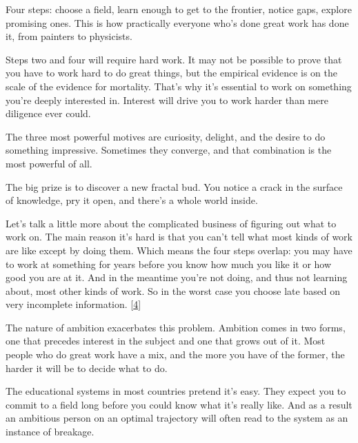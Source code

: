 Four steps: choose a field, learn enough to get
                  to the frontier, notice gaps, explore promising ones. This is
                  how practically everyone who's done great work has done it,
                  from painters to physicists.

Steps two and four
                  will require hard work. It may not be possible to prove that
                  you have to work hard to do great things, but the empirical
                  evidence is on the scale of the evidence for mortality. That's
                  why it's essential to work on something you're deeply
                  interested in. Interest will drive you to work harder than
                  mere diligence ever could.

The three most powerful
                  motives are curiosity, delight, and the desire to do something
                  impressive. Sometimes they converge, and that combination is
                  the most powerful of all.

The big prize is to
                  discover a new fractal bud. You notice a crack in the surface
                  of knowledge, pry it open, and there's a whole world
                  inside.





Let's talk a little
                  more about the complicated business of figuring out what to
                  work on. The main reason it's hard is that you can't tell what
                  most kinds of work are like except by doing them. Which means
                  the four steps overlap: you may have to work at something for
                  years before you know how much you like it or how good you are
                  at it. And in the meantime you're not doing, and thus not
                  learning about, most other kinds of work. So in the worst case
                  you choose late based on very incomplete information.
                  [\href{\#f4n}{4}]

The nature of ambition exacerbates this problem.
                  Ambition comes in two forms, one that precedes interest in the
                  subject and one that grows out of it. Most people who do great
                  work have a mix, and the more you have of the former, the
                  harder it will be to decide what to do.

The
                  educational systems in most countries pretend it's easy. They
                  expect you to commit to a field long before you could know
                  what it's really like. And as a result an ambitious person on
                  an optimal trajectory will often read to the system as an
                  instance of breakage.

